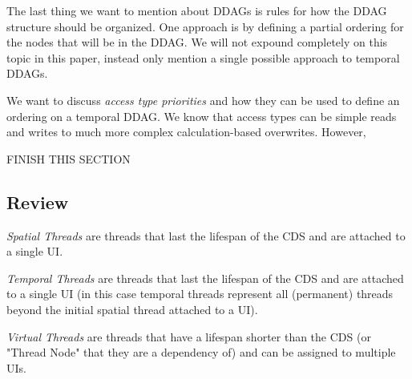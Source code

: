 The last thing we want to mention about DDAGs is rules for how the DDAG structure should be organized. One approach is by defining a partial ordering for the nodes that will be in the DDAG. We will not expound completely on this topic in this paper, instead only mention a single possible approach to temporal DDAGs.

We want to discuss \textit{access type priorities} and how they can be used to define an ordering on a temporal DDAG. We know that access types can be simple reads and writes to much more complex calculation-based overwrites. However, 

FINISH THIS SECTION


\subsection{Review}

\begin{con-def}
	\label{spatial-threads}
	\textit{Spatial Threads} are threads that last the lifespan of the CDS and are attached to a single UI.
\end{con-def}

\begin{con-def}
	\label{temporal-threads}
	\textit{Temporal Threads} are threads that last the lifespan of the CDS and are attached to a single UI (in this case temporal threads represent all (permanent) threads beyond the initial spatial thread attached to a UI).
\end{con-def}

\begin{con-def}
	\label{virtual-threads}
	\textit{Virtual Threads} are threads that have a lifespan shorter than the CDS (or "Thread Node" that they are a dependency of) and can be assigned to multiple UIs.
\end{con-def}